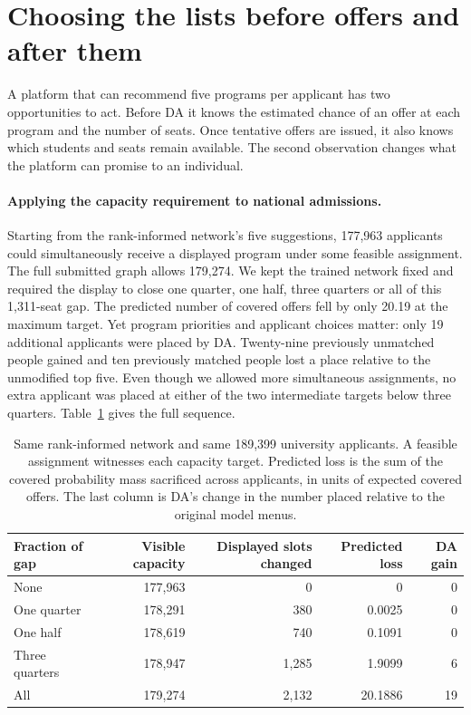 \section{Choosing the lists before offers and after them}\label{sec:policy}
A platform that can recommend five programs per applicant has two opportunities to act. Before DA it knows the estimated chance of an offer at each program and the number of seats. Once tentative offers are issued, it also knows which students and seats remain available. The second observation changes what the platform can promise to an individual.


\paragraph{Applying the capacity requirement to national admissions.}
Starting from the rank-informed network's five suggestions, 177,963 applicants could simultaneously receive a displayed program under some feasible assignment. The full submitted graph allows 179,274. We kept the trained network fixed and required the display to close one quarter, one half, three quarters or all of this 1,311-seat gap. The predicted number of covered offers fell by only 20.19 at the maximum target. Yet program priorities and applicant choices matter: only 19 additional applicants were placed by DA. Twenty-nine previously unmatched people gained and ten previously matched people lost a place relative to the unmodified top five. Even though we allowed more simultaneous assignments, no extra applicant was placed at either of the two intermediate targets below three quarters. Table~\ref{tab:capacity-policy} gives the full sequence.

\begin{table}[ht]\centering\small
\caption{Same rank-informed network and same 189,399 university applicants. A feasible assignment witnesses each capacity target. Predicted loss is the sum of the covered probability mass sacrificed across applicants, in units of expected covered offers. The last column is DA's change in the number placed relative to the original model menus.}
\label{tab:capacity-policy}
\begin{tabular}{@{}lrrrr@{}}\toprule
Fraction of gap & Visible capacity & Displayed slots changed & Predicted loss & DA gain\\\midrule
None & 177,963 & 0 & 0 & 0\\
One quarter & 178,291 & 380 & 0.0025 & 0\\
One half & 178,619 & 740 & 0.1091 & 0\\
Three quarters & 178,947 & 1,285 & 1.9099 & 6\\
All & 179,274 & 2,132 & 20.1886 & 19\\\bottomrule
\end{tabular}\end{table}

